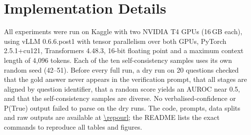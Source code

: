 \section{Implementation Details}
\label{app:implementation}
All experiments were run on Kaggle with two NVIDIA T4 GPUs (16\,GB each), using vLLM 0.6.6.post1 with tensor parallelism over both GPUs, PyTorch 2.5.1+cu121, Transformers 4.48.3, 16-bit floating point and a maximum context length of 4{,}096 tokens. Each of the ten self-consistency samples uses its own random seed (42--51). Before every full run, a dry run on 20 questions checked that the gold answer never appears in the verification prompt, that all stages are aligned by question identifier, that a random score yields an AUROC near 0.5, and that the self-consistency samples are diverse. No verbalised-confidence or P(True) output failed to parse on the dry runs. The code, prompts, data splits and raw outputs are available at \url{\repourl}; the README lists the exact commands to reproduce all tables and figures.
